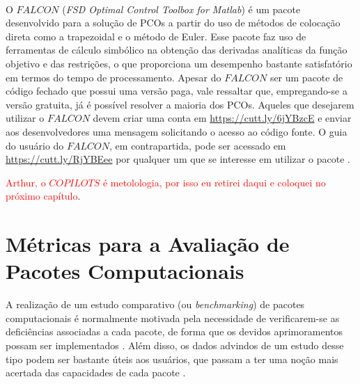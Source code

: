 O $ FALCON $ (\textit{FSD Optimal Control Toolbox for Matlab\textsuperscript{\textregistered}}) é um pacote desenvolvido para a solução de PCOs a partir do uso de métodos de colocação direta como a trapezoidal e o método de Euler. Esse pacote faz uso de ferramentas de cálculo simbólico na obtenção das derivadas analíticas da função objetivo e das restrições, o que proporciona um desempenho bastante satisfatório em termos do tempo de processamento. Apesar do $ FALCON $ ser um pacote de código fechado que possui uma versão paga, vale ressaltar que, empregando-se a versão gratuita, já é possível resolver a maioria dos PCOs. Aqueles que desejarem utilizar o $ FALCON $ devem criar uma conta em \url{https://cutt.ly/6jYBzcE} e enviar aos desenvolvedores uma mensagem solicitando o acesso ao código fonte. O guia do usuário do $ FALCON $, em contrapartida, pode ser acessado em \url{https://cutt.ly/RjYBEee} por qualquer um que se interesse em utilizar o pacote \cite{rieck_falconm_2020}.

\textcolor{red}{Arthur, o $ COPILOTS $ é metolologia, por isso eu retirei daqui e coloquei no próximo capítulo}.

\section{Métricas para a Avaliação de Pacotes Computacionais}


A realização de um estudo comparativo (ou \textit{benchmarking}) de pacotes computacionais é normalmente motivada pela necessidade de verificarem-se as deficiências associadas a cada pacote, de forma que os devidos aprimoramentos possam ser implementados \cite{dolan_benchmarking_2002}. Além disso, os dados advindos de um estudo desse tipo podem ser bastante úteis aos usuários, que passam a ter uma noção mais acertada das capacidades de cada pacote \cite{bongartz_numerical_1997, parejo_metaheuristic_2012}. 

